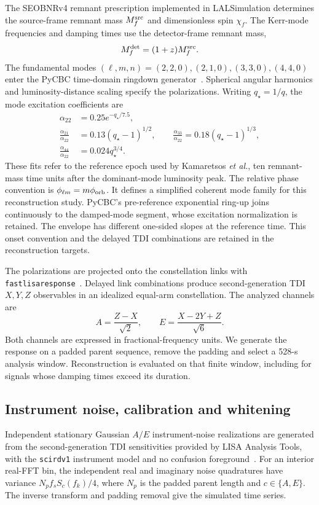 \documentclass[10pt,prd,aps,a4paper,twocolumn,superscriptaddress,nofootinbib,floatfix]{revtex4-2}
\begin{document}
The SEOBNRv4 remnant prescription implemented in LALSimulation determines the source-frame remnant mass $M_f^{\rm src}$ and dimensionless spin $\chi_f$. The Kerr-mode frequencies and damping times use the detector-frame remnant mass,
\begin{equation}
M_f^{\rm det}=(1+z)M_f^{\rm src}.
\end{equation}
The fundamental modes $(\ell,m,n)=(2,2,0),(2,1,0),(3,3,0),(4,4,0)$ enter the PyCBC time-domain ringdown generator~\cite{berti2006gravitational,berti2009qnm,PyCBCRingdown}. Spherical angular harmonics and luminosity-distance scaling specify the polarizations. Writing $q_\star=1/q$, the mode excitation coefficients are~\cite{Kamaretsos2012}
\begin{align}
\alpha_{22}&=0.25e^{-q_\star/7.5},\nonumber\\
\frac{\alpha_{21}}{\alpha_{22}}&=0.13(q_\star-1)^{1/2},\qquad
\frac{\alpha_{33}}{\alpha_{22}}=0.18(q_\star-1)^{1/3},\nonumber\\
\frac{\alpha_{44}}{\alpha_{22}}&=0.024q_\star^{3/4}.
\end{align}
These fits refer to the reference epoch used by Kamaretsos \textit{et al.}, ten remnant-mass time units after the dominant-mode luminosity peak. The relative phase convention is $\phi_{\ell m}=m\phi_{\rm orb}$. It defines a simplified coherent mode family for this reconstruction study. PyCBC's pre-reference exponential ring-up joins continuously to the damped-mode segment, whose excitation normalization is retained. The envelope has different one-sided slopes at the reference time. This onset convention and the delayed TDI combinations are retained in the reconstruction targets.

The polarizations are projected onto the constellation links with \texttt{fastlisaresponse}~\cite{Katz2022Response}. Delayed link combinations produce second-generation TDI $X,Y,Z$ observables in an idealized equal-arm constellation. The analyzed channels are
\begin{equation}
A=\frac{Z-X}{\sqrt{2}},\qquad E=\frac{X-2Y+Z}{\sqrt{6}}.\label{eq:aet_convention}
\end{equation}
Both channels are expressed in fractional-frequency units. We generate the response on a padded parent sequence, remove the padding and select a 528-s analysis window. Reconstruction is evaluated on that finite window, including for signals whose damping times exceed its duration.

\subsection{Instrument noise, calibration and whitening}\label{noise model}
Independent stationary Gaussian $A/E$ instrument-noise realizations are generated from the second-generation TDI sensitivities provided by LISA Analysis Tools, with the \texttt{scirdv1} instrument model and no confusion foreground~\cite{LISAAnalysisTools}. For an interior real-FFT bin, the independent real and imaginary noise quadratures have variance $N_p f_s S_c(f_k)/4$, where $N_p$ is the padded parent length and $c\in\{A,E\}$. The inverse transform and padding removal give the simulated time series.
\end{document}

